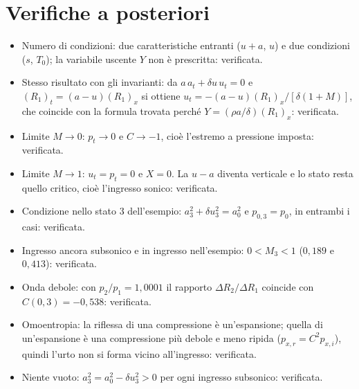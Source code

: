 \documentclass[11pt,a4paper]{article}
\newcommand{\Ru}{R_1}
\newcommand{\Rd}{R_2}
\newcommand{\uma}{u-a}
\newcommand{\upa}{u+a}
\newcommand{\Cr}{C}
\begin{document}
\section{Verifiche a posteriori}
\begin{itemize}
  \item Numero di condizioni: due caratteristiche entranti ($\upa$, $u$) e due condizioni ($s$, $T_0$); la variabile
        uscente $Y$ non è prescritta: verificata.
  \item Stesso risultato con gli invarianti: da $a\,a_t+\delta u\,u_t=0$ e $(\Ru)_t=(a-u)(\Ru)_x$ si ottiene
        $u_t=-(a-u)(\Ru)_x/[\delta(1+M)]$, che coincide con la formula trovata perché
        $Y=(\rho a/\delta)(\Ru)_x$: verificata.
  \item Limite $M\to0$: $p_t\to0$ e $\Cr\to-1$, cioè l'estremo a pressione imposta: verificata.
  \item Limite $M\to1$: $u_t=p_t=0$ e $X=0$. La $\uma$ diventa verticale e lo stato resta quello critico,
        cioè l'ingresso sonico: verificata.
  \item Condizione nello stato 3 dell'esempio: $a_3^2+\delta u_3^2=a_0^2$ e $p_{0,3}=p_0$, in entrambi i casi:
        verificata.
  \item Ingresso ancora subsonico e in ingresso nell'esempio: $0<M_3<1$ ($0{,}189$ e $0{,}413$): verificata.
  \item Onda debole: con $p_2/p_1=1{,}0001$ il rapporto $\Delta\Rd/\Delta\Ru$ coincide con $\Cr(0{,}3)=-0{,}538$:
        verificata.
  \item Omoentropia: la riflessa di una compressione è un'espansione; quella di un'espansione è una compressione
        più debole e meno ripida ($p_{x,r}=\Cr^2p_{x,i}$), quindi l'urto non si forma vicino all'ingresso: verificata.
  \item Niente vuoto: $a_3^2=a_0^2-\delta u_3^2>0$ per ogni ingresso subsonico: verificata.
\end{itemize}

\end{document}
